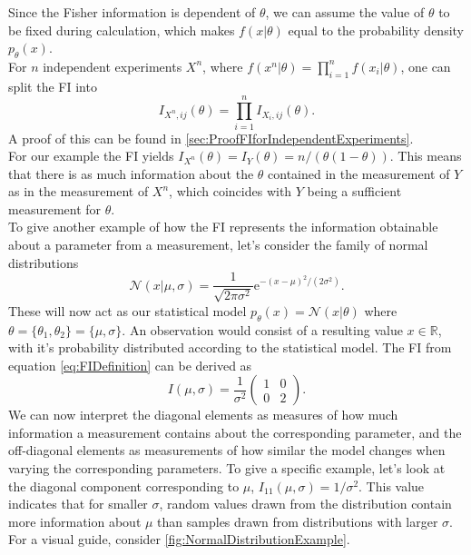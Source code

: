 Since the Fisher information is dependent of $\theta$, we can assume the value of $\theta$ to be fixed during calculation, which makes $f(x|\theta)$ equal to the probability density $p_\theta(x)$.\\ 
For $n$ independent experiments $X^n$, where $f(x^n|\theta) = \prod_{i=1}^n f(x_i|\theta)$, one can split the FI into 
\begin{equation}\label{eq:FIforIndependentExperiments}
	I_{X^n,ij}(\theta) = \prod_{i=1}^n I_{X_i,ij}(\theta).
\end{equation}
A proof of this can be found in \cref{sec:ProofFIforIndependentExperiments}.\\
For our example the FI yields $I_{X^n}(\theta) = I_{Y}(\theta) = n/(\theta(1-\theta))$\cite{StatisticFisherInfoTutorial}. This means that there is as much information about the $\theta$ contained in the measurement of $Y$ as in the measurement of $X^n$, which coincides with $Y$ being a sufficient measurement for $\theta$. \\
To give another example of how the FI represents the information obtainable about a parameter from a measurement, let's consider the family of normal distributions
\begin{equation}
	\mathcal{N}(x|\mu,\sigma) = \frac{1}{\sqrt{2\pi\sigma^2}}\mathrm{e}^{-(x-\mu)^2/(2\sigma^2)}.
\end{equation} 
These will now act as our statistical model $p_\theta(x) = \mathcal{N}(x|\theta)$ where $\theta = \{\theta_1,\theta_2\} = \{\mu, \sigma\}$. An observation would consist of a resulting value $x\in \mathbb{R}$, with it's probability distributed according to the statistical model. The FI from equation \cref{eq:FIDefinition} can be derived as 
\begin{equation}
	I(\mu,\sigma) = \frac{1}{\sigma^2}
	\begin{pmatrix}
		1 & 0 \\
		0 & 2
	\end{pmatrix}.
\end{equation}
We can now interpret the diagonal elements as measures of how much information a measurement contains about the corresponding parameter, and the off-diagonal elements as measurements of how similar the model changes when varying the corresponding parameters. To give a specific example, let's look at the diagonal component corresponding to $\mu$, $I_{11}(\mu,\sigma) = 1/\sigma^2$. This value indicates that for smaller $\sigma$, random values drawn from the distribution contain more information about $\mu$ than samples drawn from distributions with larger $\sigma$. For a visual guide, consider \cref{fig:NormalDistributionExample}.
